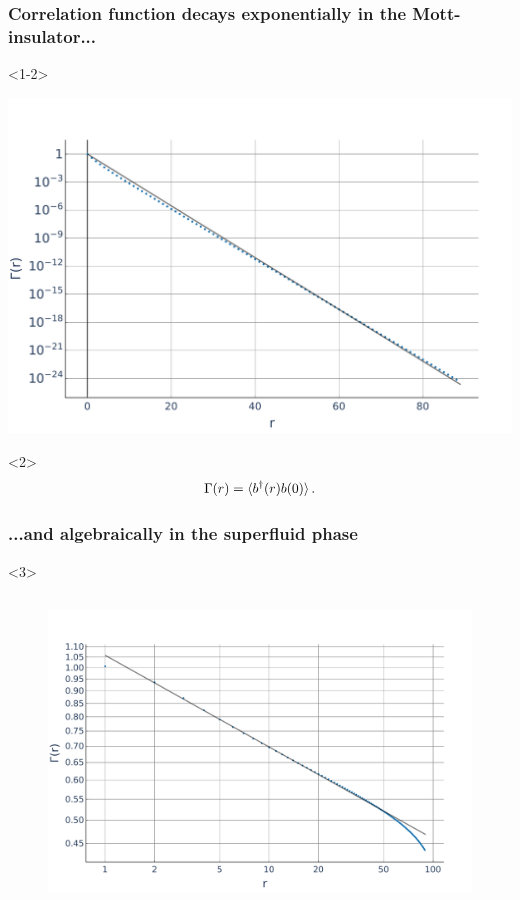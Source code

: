 \documentclass[aspectratio=169]{beamer}
\begin{document}
\begin{frame}
  \frametitle<1-2>{Correlation function decays exponentially in the Mott-insulator...}
  \begin{onlyenv}<1-2>
    \begin{center}
      \includegraphics[scale=0.22]{../img/Correlations-MI1.pdf}
    \end{center}
  \end{onlyenv}
  \begin{onlyenv}<2>
    \begin{equation}\label{eq:correlation decay}
      \Gamma(r) = \langle b^\dagger(r)b(0)\rangle \thinspace .
    \end{equation}
  \end{onlyenv}
  \frametitle<3>{...and algebraically in the superfluid phase}
  \begin{onlyenv}<3>
    \begin{columns}[onlytextwidth]
      \begin{column}{0.5\textwidth}
        \begin{figure}[ht]
          \centering
          \includegraphics[scale=0.2]{../img/Correlations-SF1.pdf}

\end{figure}
\end{column}
\end{columns}
\end{onlyenv}
\end{frame}
\end{document}
